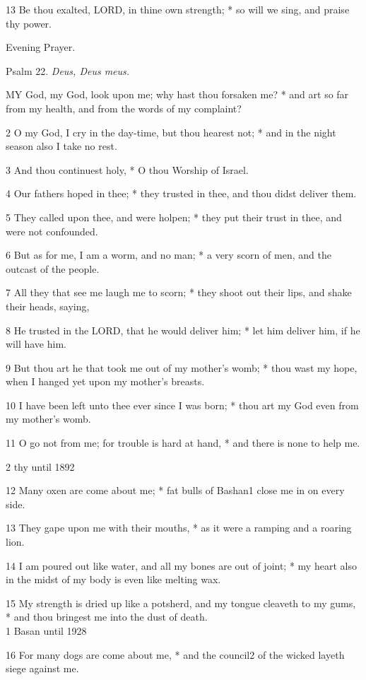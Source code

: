 13 Be thou exalted, LORD, in
thine own strength; * so will we sing, and praise thy power.

Evening
Prayer.

Psalm
22. \emph{Deus, Deus meus.}

MY
God, my God, look upon me; why hast thou forsaken me? * and art so far
from my health, and from the words of my complaint?

2 O my God, I cry in the day-time, but thou hearest
not; * and in the night season also I take no rest.

3 And thou continuest holy, * O thou Worship of Israel.

4 Our fathers hoped in thee; * they trusted in thee,
and thou didst deliver them.

5 They called upon thee, and were holpen; * they put
their trust in thee, and were not confounded.

6 But as for me, I am a worm, and no man; * a very
scorn of men, and the outcast of the people.

7 All they that see me laugh me to scorn; * they shoot
out their lips, and shake their heads, saying,

8 He trusted in the LORD, that
he would deliver him; * let him deliver him, if he will have him.

9 But thou art he that took me out of my mother's womb;
* thou wast my hope, when I hanged yet upon my mother’s breasts.

10 I have been left unto thee ever since I was born;
* thou art my God even from my mother's womb.

11 O go not from me; for trouble is hard at hand, *
and there is none to help me.

2 thy
until 1892

12 Many oxen are come about me; * fat bulls of Bashan1 close
me in on every side.

13 They gape upon me with their mouths, * as it were
a ramping and a roaring lion.

14 I am poured out like water, and all my bones are out
of joint; * my heart also in the midst of my body is even like melting wax.

15 My strength is dried up like a potsherd, and my tongue
cleaveth to my gums, * and thou bringest me into the dust of death. \\
1 Basan
until 1928

16 For many dogs are come about me, * and the council2
of the wicked layeth siege against me.


